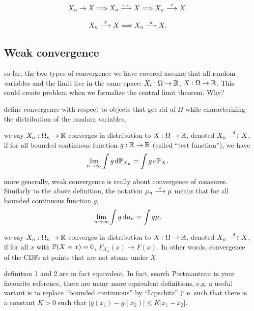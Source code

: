 \documentclass{article}
\begin{document}
\[ X_n \to X \Longrightarrow X_n \ascv X \Longrightarrow X_n \pcv X. \]

\[ X_n \pcv X \Longrightarrow X_n \dcv X. \]


\subsection{Weak convergence}

 so far, the two types of convergence we have covered assume that all random variables and the limit live in the same space: $X_i : \Omega \to \R$, $X : \Omega \to \R$. This could create problem when we formalize the central limit theorem. Why?

 define convergence with respect to objects that get rid of $\Omega$ while characterizing the distribution of the random variables.

 we say $X_n : \Omega_n \to \R$ converges in distribution to $X : \Omega \to \R$, denoted $X_n \dcv X$, if for all bounded continuous function $g : \R \to \R$ (called ``test function''), we have 
\[ \lim_{n\to\infty} \int g \ud \P_{X_n} = \int g \ud \P_X. \]

 more generally, weak convergence is really about convergence of measures. Similarly to the above definition, the notation $\mu_n \dcv \mu$ means that for all bounded continuous function $g$, \[ \lim_{n\to\infty} \int g \ud \mu_n = \int g \mu. \]

 we say $X_n : \Omega_n \to \R$ converges in distribution to $X : \Omega \to \R$, denoted $X_n \dcv X$, if for all $x$ with $\P(X=x) = 0$, $F_{X_n}(x) \to F(x)$. In other words, convergence of the CDFs at points that are not atoms under $X$.

 definition 1 and 2 are in fact equivalent. In fact, search Portmanteau in your favourite reference, there are many more equivalent definitions, e.g. a useful variant is to replace ``bounded continuous'' by ``Lipschitz'' (i.e. such that there is a constant $K > 0$ such that $|g(x_1) - g(x_2)| \le K |x_1 - x_2 |$.
\end{document}
